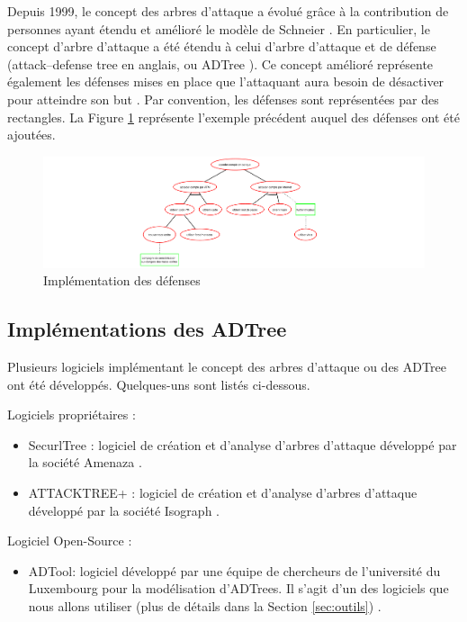 		Depuis 1999, le concept des arbres d'attaque a évolué grâce à la contribution de personnes ayant étendu et amélioré le modèle de Schneier \cite{ADTreeKordy}. En particulier, le concept d'arbre d'attaque a été étendu à celui d’arbre d’attaque et de défense (\og attack–defense tree \fg{} en anglais, ou \og ADTree \fg{}). Ce concept amélioré représente également les défenses mises en place que l'attaquant aura besoin de désactiver pour atteindre son but \cite{ADTreeOxford}. Par convention, les défenses sont représentées par des rectangles. La Figure \ref{fig:arbre_exemple_3} représente l'exemple précédent auquel des défenses ont été ajoutées.

        \begin{figure}[htbp]
        \centering
        \includegraphics[width=\textwidth]{figure/exemple2_rapport.pdf}%
        \caption{Implémentation des défenses}
        \label{fig:arbre_exemple_3}
        \end{figure}

	\subsection{Implémentations des ADTree}
		Plusieurs logiciels implémentant le concept des arbres d'attaque ou des ADTree ont été développés. Quelques-uns sont listés ci-dessous.
        
        Logiciels propriétaires :
        \begin{itemize}
        \item SecurlTree : logiciel de création et d'analyse d'arbres d'attaque développé par la société Amenaza \cite{SecurlTree}.
        \item ATTACKTREE+ : logiciel de création et d'analyse d'arbres d'attaque développé par la société Isograph \cite{ATTACKTREE+}.
        \end{itemize}
        
        Logiciel Open-Source :
        \begin{itemize}
        \item ADTool: logiciel développé par une équipe de chercheurs de l'université du Luxembourg pour la modélisation d'ADTrees. Il s'agit d'un des logiciels que nous allons utiliser (plus de détails dans la Section \ref{sec:outils}) \cite{ADTool}.
        \end{itemize}

